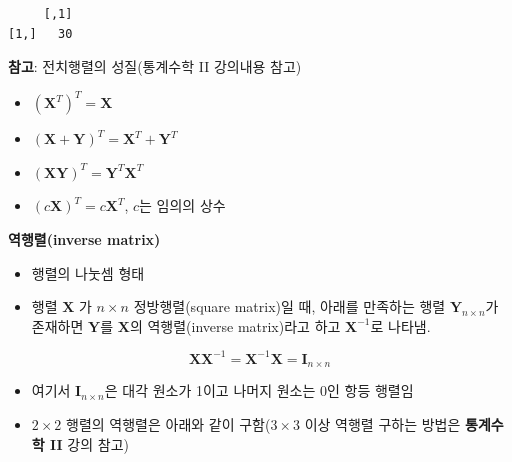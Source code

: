 \documentclass[
  11pt,
]{krantz}
\makeatletter
\newenvironment{Shaded}{\begin{snugshade}}{\end{snugshade}}
\newcommand{\CommentTok}[1]{\textcolor[rgb]{0.37,0.37,0.37}{\textit{#1}}}
\newcommand{\KeywordTok}[1]{\textcolor[rgb]{0.27,0.27,0.27}{\textbf{#1}}}
\newcommand{\NormalTok}[1]{#1}
\newcommand{\OperatorTok}[1]{\textcolor[rgb]{0.43,0.43,0.43}{\textbf{#1}}}
\newcommand{\StringTok}[1]{\textcolor[rgb]{0.5,0.5,0.5}{#1}}
\providecommand{\tightlist}{%
  \setlength{\itemsep}{0pt}\setlength{\parskip}{0pt}}
\newenvironment{kframe}{%
\medskip{}
\setlength{\fboxsep}{.8em}
 \def\at@end@of@kframe{}%
 \ifinner\ifhmode%
  \def\at@end@of@kframe{\end{minipage}}%
  \begin{minipage}{\columnwidth}%
 \fi\fi%
 \def\FrameCommand##1{\hskip\@totalleftmargin \hskip-\fboxsep
 \colorbox{shadecolor}{##1}\hskip-\fboxsep
     \hskip-\linewidth \hskip-\@totalleftmargin \hskip\columnwidth}%
 \MakeFramed {\advance\hsize-\width
   \@totalleftmargin\z@ \linewidth\hsize
   \@setminipage}}%
 {\par\unskip\endMakeFramed%
 \at@end@of@kframe}
\newenvironment{rmdblock}[1]
  {
  \begin{itemize}
  \renewcommand{\labelitemi}{
    \raisebox{-.7\height}[0pt][0pt]{
      {\setkeys{Gin}{width=3em,keepaspectratio}\texttt{[image: images/\#1]}}
    }
  }
  \setlength{\fboxsep}{1em}
  \begin{kframe}
  \item
  }
  {
  \end{kframe}
  \end{itemize}
  }
\newenvironment{rmdtip}
  {\begin{rmdblock}{tip}}
  {\end{rmdblock}}
\makeatother
\begin{document}
\begin{Shaded}
\end{Shaded}

\begin{verbatim}
     [,1]
[1,]   30
\end{verbatim}

\normalsize

\footnotesize

\begin{rmdtip}
\begin{rmdtip}

\textbf{참고}: 전치행렬의 성질(통계수학 II 강의내용 참고)

\begin{itemize}
\tightlist
\item
  \((\mathrm{\mathbf{X}}^T)^T = \mathrm{\mathbf{X}}\)
\item
  \((\mathrm{\mathbf{X} + \mathbf{Y}})^T = \mathrm{\mathbf{X}}^T + \mathrm{\mathbf{Y}}^T\)
\item
  \((\mathrm{\mathbf{X}\mathbf{Y}})^T = \mathrm{\mathbf{Y}}^T\mathrm{\mathbf{X}}^T\)
\item
  \((c\mathrm{\mathbf{X}})^T = c\mathrm{\mathbf{X}}^T\), \(c\)는 임의의 상수
\end{itemize}

\end{rmdtip}
\end{rmdtip}

\normalsize

\textbf{역행렬(inverse matrix)}

\begin{itemize}
\tightlist
\item
  행렬의 나눗셈 형태
\item
  행렬 \(\mathrm{\mathbf{X}}\) 가 \(n \times n\) 정방행렬(square matrix)일 때, 아래를 만족하는 행렬 \(\mathrm{\mathbf{Y}}_{n \times n}\)가 존재하면 \(\mathrm{\mathbf{Y}}\)를 \(\mathrm{\mathbf{X}}\)의 역행렬(inverse matrix)라고 하고 \(\mathrm{\mathbf{X}}^{-1}\)로 나타냄.
\end{itemize}

\[
 \mathrm{\mathbf{X}\mathbf{X}^{-1}} = \mathrm{\mathbf{X}^{-1}\mathbf{X}} = \mathrm{\mathbf{I}}_{n\times n}
\]

\begin{itemize}
\tightlist
\item
  여기서 \(\mathrm{\mathbf{I}}_{n\times n}\)은 대각 원소가 1이고 나머지 원소는 0인 항등 행렬임
\item
  \(2 \times 2\) 행렬의 역행렬은 아래와 같이 구함(\(3\times 3\) 이상 역행렬 구하는 방법은 \textbf{통계수학 II} 강의 참고)
\end{itemize}
\end{document}
